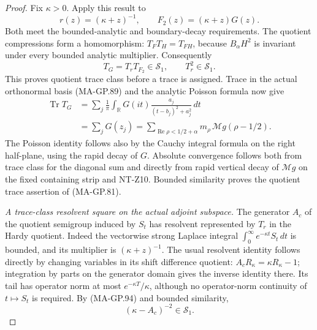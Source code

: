 \begin{proof}
Fix $\kappa>0$.  Apply this result to
\[
                    r(z)=(\kappa+z)^{-1},
               \qquad F_2(z)=(\kappa+z)G(z).
 \tag{MA-GP.93}
\]
Both meet the bounded-analytic and boundary-decay requirements.
The quotient compressions form a homomorphism:
$T_FT_H=T_{FH}$, because $B_\alpha H^2$ is invariant under
every bounded analytic multiplier.
Consequently
\[
                          T_G=T_rT_{F_2}\in\mathcal S_1,
             \qquad T_r^2\in\mathcal S_1.
 \tag{MA-GP.94}
\]
This proves quotient trace class before a trace is assigned.
Trace in the actual orthonormal basis (MA-GP.89) and the
analytic Poisson formula now give
\[
 \begin{split}
 \operatorname{Tr}T_G
   &=\sum_j\frac1\pi\int_{\mathbb R}
                   G(it)\frac{a_j}{(t-b_j)^2+a_j^2}\,dt\\
   &=\sum_jG(z_j)
    =\sum_{\operatorname{Re}\rho<1/2+\alpha}
                      m_\rho\,\mathcal Mg(\rho-1/2).
 \end{split}
 \tag{MA-GP.95}
\]
The Poisson identity follows also by the Cauchy integral
formula on the right half-plane, using the rapid decay of
$G$.  Absolute convergence follows both from trace class
for the diagonal sum and directly from rapid vertical
decay of $\mathcal Mg$ on the fixed containing strip and
NT-Z10.  Bounded similarity proves the quotient trace
assertion of (MA-GP.81).

\emph{A trace-class resolvent square on the actual adjoint subspace.}
The generator $A_c$ of the quotient semigroup induced by $S_t$
has resolvent represented by $T_r$ in the Hardy quotient.
Indeed the vectorwise strong Laplace integral
$\int_0^\infty e^{-\kappa t}S_t\,dt$ is bounded, and
its multiplier is $(\kappa+z)^{-1}$.
The usual resolvent identity follows directly by changing
variables in its shift difference quotient:
$A_cR_\kappa=\kappa R_\kappa-1$; integration by parts
on the generator domain gives the inverse identity there.
Its tail has operator norm at most $e^{-\kappa T}/\kappa$,
although no operator-norm continuity of $t\mapsto S_t$
is required.  By (MA-GP.94) and bounded similarity,
\[
                        (\kappa-A_c)^{-2}\in\mathcal S_1.
 \tag{MA-GP.96}
\]


\end{proof}
